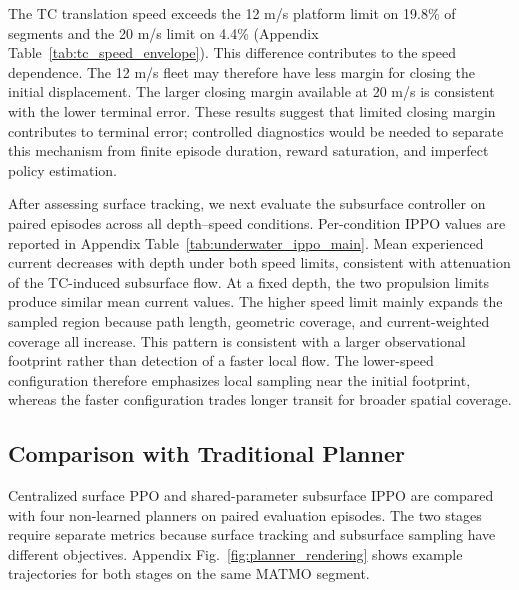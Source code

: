 \documentclass[a4paper,fleqn]{cas-dc}
\begin{document}
The TC translation speed exceeds the 12 m/s platform limit on 19.8\% of
segments and the 20 m/s limit on 4.4\% (Appendix
Table~\ref{tab:tc_speed_envelope}). This difference contributes to the speed
dependence.
The 12 m/s fleet may therefore have less margin for closing the initial
displacement. The larger closing margin available at 20 m/s is consistent with
the lower terminal error. These results suggest that
limited closing margin contributes to terminal error; controlled diagnostics
would be needed to separate this mechanism from finite episode duration,
reward saturation, and imperfect policy estimation.

After assessing surface tracking, we next evaluate the subsurface controller
on paired episodes across all depth--speed conditions. Per-condition IPPO values
are reported in Appendix Table~\ref{tab:underwater_ippo_main}. Mean experienced
current decreases with depth under both speed limits, consistent with attenuation
of the TC-induced subsurface flow. At a fixed depth, the two propulsion limits
produce similar mean current values. The higher speed limit mainly expands the
sampled region because path length, geometric coverage, and current-weighted
coverage all increase.
This pattern is consistent with a larger observational footprint rather than
detection of a faster local flow. The lower-speed configuration therefore
emphasizes local sampling near the initial footprint, whereas the faster
configuration trades longer transit for broader spatial coverage.

\subsection{Comparison with Traditional Planner}
\label{subsec:planner_comparison}

Centralized surface PPO and shared-parameter subsurface IPPO are compared with
four non-learned planners on paired evaluation episodes. The two stages require
separate metrics because surface tracking and subsurface sampling have
different objectives. Appendix Fig.~\ref{fig:planner_rendering} shows
example trajectories for both stages on the same MATMO segment.
\end{document}
